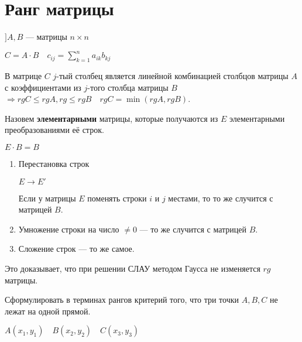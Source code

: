 

\cfoot{}



\section{Ранг матрицы}

$] A,B$ --- матрицы $n\times n$

$C = A\cdot B \quad c_{ij}=\sum\limits_{k=1}^n a_{ik}b_{kj}$

В матрице $C$ $j$-тый столбец является линейной комбинацией столбцов матрицы $A$ с коэффициентами из $j$-того столбца матрицы $B$ $\Rightarrow rg C \leq rg A, rg \leq rg B \quad rg C = \min(rg A, rg B)$.

\begin{definition}
    Назовем \textbf{элементарными} матрицы, которые получаются из $E$ элементарными преобразованиями её строк.
\end{definition}

$E\cdot B = B$

\begin{enumerate}
    \item Перестановка строк

          $E\to E'$

          Если у матрицы $E$ поменять строки $i$ и $j$ местами, то то же случится с матрицей $B$.

    \item Умножение строки на число $\not=0$ --- то же случится с матрицей $B$.
    \item Сложение строк --- то же самое.
\end{enumerate}

Это доказывает, что при решении СЛАУ методом Гаусса не изменяется $rg$ матрицы.

\begin{example}
    Сформулировать в терминах рангов критерий того, что три точки $A, B, C$ не лежат на одной прямой.
\end{example}

$A(x_1, y_1) \quad B(x_2, y_2) \quad C(x_3, y_3)$

